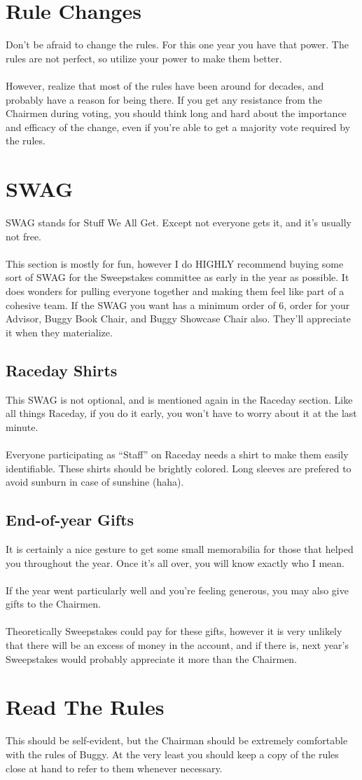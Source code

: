 \section{Rule Changes}
\label{sec:Rule Changes}
Don't be afraid to change the rules. For this one year you have that power.
The rules are not perfect, so utilize your power to make them better.
\\\\
However, realize that most of the rules have been around for decades, and
probably have a reason for being there. If you get any resistance from the
Chairmen during voting, you should think long and hard about the importance
and efficacy of the change, even if you're able to get a majority vote
required by the rules.

\section{SWAG}
\label{sec:SWAG}
SWAG stands for Stuff We All Get. Except not everyone gets it, and it's
usually not free.
\\\\
This section is mostly for fun, however I do HIGHLY recommend buying some
sort of SWAG for the Sweepstakes committee as early in the year as possible.
It does wonders for pulling everyone together and making them feel like part
of a cohesive team. If the SWAG you want has a minimum order of 6, order for
your Advisor, Buggy Book Chair, and Buggy Showcase Chair also. They'll
appreciate it when they materialize.

\subsection{Raceday Shirts}
This SWAG is not optional, and is mentioned again in the Raceday section.
Like all things Raceday, if you do it early, you won't have to worry about it
at the last minute.
\\\\
Everyone participating as ``Staff'' on Raceday needs a shirt to make them
easily identifiable. These shirts should be brightly colored. Long sleeves
are prefered to avoid sunburn in case of sunshine (haha).

\subsection{End-of-year Gifts}
It is certainly a nice gesture to get some small memorabilia for those that
helped you throughout the year. Once it's all over, you will know exactly
who I mean.
\\\\
If the year went particularly well and you're feeling generous, you may
also give gifts to the Chairmen.
\\\\
Theoretically Sweepstakes could pay for these gifts, however it is very
unlikely that there will be an excess of money in the account, and if there
is, next year's Sweepstakes would probably appreciate it more than the
Chairmen.


\section{Read The Rules}
This should be self-evident, but the Chairman should be extremely comfortable
with the rules of Buggy. At the very least you should keep a copy of the rules
close at hand to refer to them whenever necessary.
